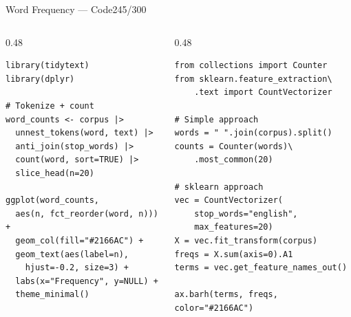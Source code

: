 \documentclass[10pt]{beamer}
\newcommand{\smark}[1]{\hfill{\scriptsize\color{codegray}#1}}
\begin{document}
\begin{frame}[fragile]{Word Frequency --- Code}\smark{245/300}
\begin{columns}[T]
\begin{column}{0.48\textwidth}
\begin{lstlisting}[style=Rstyle]
library(tidytext)
library(dplyr)

# Tokenize + count
word_counts <- corpus |>
  unnest_tokens(word, text) |>
  anti_join(stop_words) |>
  count(word, sort=TRUE) |>
  slice_head(n=20)

ggplot(word_counts,
  aes(n, fct_reorder(word, n))) +
  geom_col(fill="#2166AC") +
  geom_text(aes(label=n),
    hjust=-0.2, size=3) +
  labs(x="Frequency", y=NULL) +
  theme_minimal()
\end{lstlisting}
\end{column}
\begin{column}{0.48\textwidth}
\begin{lstlisting}[style=Pystyle]
from collections import Counter
from sklearn.feature_extraction\
    .text import CountVectorizer

# Simple approach
words = " ".join(corpus).split()
counts = Counter(words)\
    .most_common(20)

# sklearn approach
vec = CountVectorizer(
    stop_words="english",
    max_features=20)
X = vec.fit_transform(corpus)
freqs = X.sum(axis=0).A1
terms = vec.get_feature_names_out()

ax.barh(terms, freqs, color="#2166AC")
\end{lstlisting}
\end{column}
\end{columns}
\end{frame}
\end{document}
